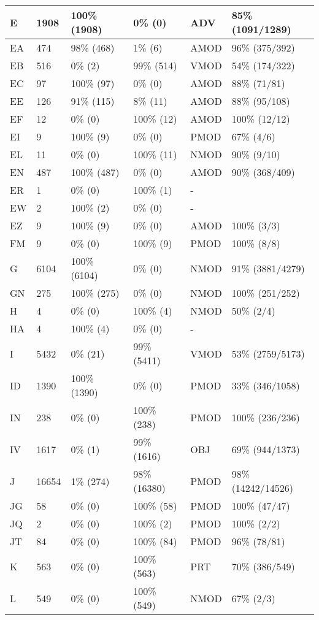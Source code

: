\begin{figure*}
\begin{tabular}{|l|l|l|l||l|l|}
\hline
 E & 1908 & 100\% (1908) & 0\% (0) & ADV & 85\% (1091/1289) \\ 
\hline
 EA & 474 & 98\% (468) & 1\% (6) & AMOD & 96\% (375/392) \\ 
\hline
 EB & 516 & 0\% (2) & 99\% (514) & VMOD & 54\% (174/322) \\ 
\hline
 EC & 97 & 100\% (97) & 0\% (0) & AMOD & 88\% (71/81) \\ 
\hline
 EE & 126 & 91\% (115) & 8\% (11) & AMOD & 88\% (95/108) \\ 
\hline
 EF & 12 & 0\% (0) & 100\% (12) & AMOD & 100\% (12/12) \\ 
\hline
 EI & 9 & 100\% (9) & 0\% (0) & PMOD & 67\% (4/6) \\ 
\hline
 EL & 11 & 0\% (0) & 100\% (11) & NMOD & 90\% (9/10) \\ 
\hline
 EN & 487 & 100\% (487) & 0\% (0) & AMOD & 90\% (368/409) \\ 
\hline
 ER & 1 & 0\% (0) & 100\% (1) & - &  \\ 
\hline
 EW & 2 & 100\% (2) & 0\% (0) & - &  \\ 
\hline
 EZ & 9 & 100\% (9) & 0\% (0) & AMOD & 100\% (3/3) \\ 
\hline
 FM & 9 & 0\% (0) & 100\% (9) & PMOD & 100\% (8/8) \\ 
\hline
 G & 6104 & 100\% (6104) & 0\% (0) & NMOD & 91\% (3881/4279) \\ 
\hline
 GN & 275 & 100\% (275) & 0\% (0) & NMOD & 100\% (251/252) \\ 
\hline
 H & 4 & 0\% (0) & 100\% (4) & NMOD & 50\% (2/4) \\ 
\hline
 HA & 4 & 100\% (4) & 0\% (0) & - &  \\ 
\hline
 I & 5432 & 0\% (21) & 99\% (5411) & VMOD & 53\% (2759/5173) \\ 
\hline
 ID & 1390 & 100\% (1390) & 0\% (0) & PMOD & 33\% (346/1058) \\ 
\hline
 IN & 238 & 0\% (0) & 100\% (238) & PMOD & 100\% (236/236) \\ 
\hline
 IV & 1617 & 0\% (1) & 99\% (1616) & OBJ & 69\% (944/1373) \\ 
\hline
 J & 16654 & 1\% (274) & 98\% (16380) & PMOD & 98\% (14242/14526) \\ 
\hline
 JG & 58 & 0\% (0) & 100\% (58) & PMOD & 100\% (47/47) \\ 
\hline
 JQ & 2 & 0\% (0) & 100\% (2) & PMOD & 100\% (2/2) \\ 
\hline
 JT & 84 & 0\% (0) & 100\% (84) & PMOD & 96\% (78/81) \\ 
\hline
 K & 563 & 0\% (0) & 100\% (563) & PRT & 70\% (386/549) \\ 
\hline
 L & 549 & 0\% (0) & 100\% (549) & NMOD & 67\% (2/3) \\ 
\hline
\end{tabular}
\end{figure*}
